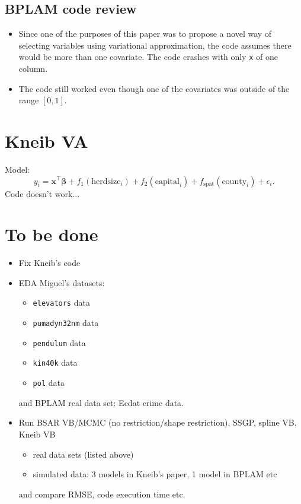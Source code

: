 \documentclass[11pt]{article}
\newcommand{\bs}{\boldsymbol}
\begin{document}
\subsection{BPLAM code review}
  \begin{itemize}
  \item Since one of the purposes of this paper was to propose a novel way of selecting variables using variational approximation, the code assumes there would be more than one covariate. The code crashes with only \texttt{x} of one column.
  \item The code still worked even though one of the covariates was outside of the range $\left[0,1\right]$. 
  \end{itemize}
\section{Kneib VA}
Model:
\begin{equation}
  y_{i} = \mathbf{x}^{\top}\bs{\beta}+f_{1}\left(\text{herdsize}_{i}\right)+f_{2}\left(\text{capital}_{i}\right)+f_{\text{spat}}\left(\text{county}_{i}\right) + \epsilon_{i}.
\end{equation}
Code doesn't work...
\section{To be done}
\begin{itemize}
  \item Fix Kneib's code
  \item EDA Miguel's datasets:
    \begin{itemize}
      \item \texttt{elevators} data
      \item \texttt{pumadyn32nm} data
      \item \texttt{pendulum} data
      \item \texttt{kin40k} data
      \item \texttt{pol} data
    \end{itemize}
    and BPLAM real data set: \textsf{Ecdat} crime data.
  \item Run BSAR VB/MCMC (no restriction/shape restriction), SSGP, spline VB, Kneib VB
    \begin{itemize}
      \item real data sets (listed above)
      \item simulated data: 3 models in Kneib's paper, 1 model in BPLAM etc
    \end{itemize}
    and compare RMSE, code execution time etc.
\end{itemize}
\end{document}
